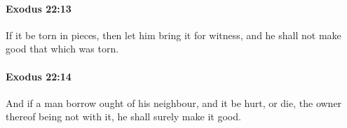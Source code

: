 		\paragraph{Exodus 22:13} %
			\label{EXODUS-22-13}

			If it be torn in pieces, then let him bring it for witness, and he shall not make good that which was torn.


		\paragraph{Exodus 22:14} %
			\label{EXODUS-22-14}

			And if a man borrow ought of his neighbour, and it be hurt, or die, the owner thereof being not with it, he shall surely make it good.


